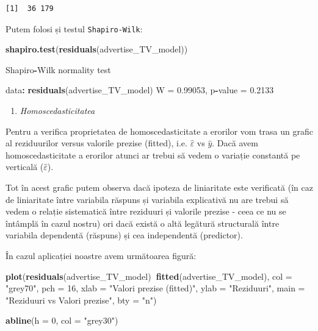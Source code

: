 \documentclass[]{article}
\newenvironment{Shaded}{\begin{snugshade}}{\end{snugshade}}
\newcommand{\KeywordTok}[1]{\textcolor[rgb]{0.13,0.29,0.53}{\textbf{#1}}}
\newcommand{\DataTypeTok}[1]{\textcolor[rgb]{0.13,0.29,0.53}{#1}}
\newcommand{\DecValTok}[1]{\textcolor[rgb]{0.00,0.00,0.81}{#1}}
\newcommand{\FloatTok}[1]{\textcolor[rgb]{0.00,0.00,0.81}{#1}}
\newcommand{\StringTok}[1]{\textcolor[rgb]{0.31,0.60,0.02}{#1}}
\newcommand{\OperatorTok}[1]{\textcolor[rgb]{0.81,0.36,0.00}{\textbf{#1}}}
\newcommand{\NormalTok}[1]{#1}
\providecommand{\tightlist}{%
  \setlength{\itemsep}{0pt}\setlength{\parskip}{0pt}}
\begin{document}
\begin{verbatim}
[1]  36 179
\end{verbatim}

Putem folosi și testul \texttt{Shapiro-Wilk}:

\begin{Shaded}
\begin{Highlighting}[]
\KeywordTok{shapiro.test}\NormalTok{(}\KeywordTok{residuals}\NormalTok{(advertise_TV_model))}

\NormalTok{    Shapiro}\OperatorTok{-}\NormalTok{Wilk normality test}

\NormalTok{data}\OperatorTok{:}\StringTok{  }\KeywordTok{residuals}\NormalTok{(advertise_TV_model)}
\NormalTok{W =}\StringTok{ }\FloatTok{0.99053}\NormalTok{, p}\OperatorTok{-}\NormalTok{value =}\StringTok{ }\FloatTok{0.2133}
\end{Highlighting}
\end{Shaded}

\begin{enumerate}
\def\labelenumi{\alph{enumi})}
\setcounter{enumi}{2}
\tightlist
\item
  \emph{Homoscedasticitatea}
\end{enumerate}

Pentru a verifica proprietatea de homoscedasticitate a erorilor vom
trasa un grafic al reziduurilor versus valorile prezise (fitted), i.e.
\(\hat{\varepsilon}\) vs \(\hat{y}\). Dacă avem homoscedasticitate a
erorilor atunci ar trebui să vedem o variație constantă pe verticală
(\(\hat{\varepsilon}\)).

Tot în acest grafic putem observa dacă ipoteza de liniaritate este
verificată (în caz de liniaritate între variabila răspuns și variabila
explicativă nu are trebui să vedem o relație sistematică între reziduuri
și valorile prezise - ceea ce nu se întâmplă în cazul nostru) ori dacă
există o altă legătură structurală între variabila dependentă (răspuns)
și cea independentă (predictor).

În cazul aplicației noastre avem următoarea figură:

\begin{Shaded}
\begin{Highlighting}[]
\KeywordTok{plot}\NormalTok{(}\KeywordTok{residuals}\NormalTok{(advertise_TV_model)}\OperatorTok{~}\KeywordTok{fitted}\NormalTok{(advertise_TV_model),  }
     \DataTypeTok{col =} \StringTok{"grey70"}\NormalTok{, }\DataTypeTok{pch =} \DecValTok{16}\NormalTok{, }
     \DataTypeTok{xlab =} \StringTok{"Valori prezise (fitted)"}\NormalTok{,}
     \DataTypeTok{ylab =} \StringTok{"Reziduuri"}\NormalTok{, }
     \DataTypeTok{main =} \StringTok{"Reziduuri vs Valori prezise"}\NormalTok{,}
     \DataTypeTok{bty =} \StringTok{"n"}\NormalTok{)}

\KeywordTok{abline}\NormalTok{(}\DataTypeTok{h =} \DecValTok{0}\NormalTok{, }\DataTypeTok{col =} \StringTok{"grey30"}\NormalTok{)}
\end{Highlighting}
\end{Shaded}
\end{document}
